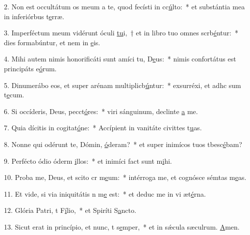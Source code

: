 2. Non est occultátum os meum a te, quod fecísti in cc\uline{ú}lto:~* et substántia mea in inferiórbus t\uline{e}rræ.\par 
3. Imperféctum meum vidérunt óculi \uline{tu}i,~† et in libro tuo omnes scrb\uline{é}ntur:~* dies formabúntur, et nem in \uline{e}is.\par 
4. Mihi autem nimis honorificáti sunt amíci tu, D\uline{e}us:~* nimis confortátus est principáts e\uline{ó}rum.\par 
5. Dinumerábo eos, et super arénam multiplicb\uline{ú}ntur:~* exsurréxi, et adhc sum t\uline{e}cum.\par 
6. Si occíderis, Deus, pecct\uline{ó}res:~* viri sánguinum, declinte \uline{a} me.\par 
7. Quia dícitis in cogitat\uline{ó}ne:~* Accípient in vanitáte civittes t\uline{u}as.\par 
8. Nonne qui odérunt te, Dómin, \uline{ó}deram?~* et super inimícos tuos tbesc\uline{é}bam?\par 
9. Perfécto ódio óderm \uline{i}llos:~* et inimíci fact sunt m\uline{i}hi.\par 
10. Proba me, Deus, et scito cr m\uline{e}um:~* intérroga me, et cognósce sémtas m\uline{e}as.\par 
11. Et vide, si via iniquitátis n m\uline{e} est:~* et deduc me in vi æt\uline{é}rna.\par 
12. Glória Patri, t F\uline{í}lio,~* et Spiríti S\uline{a}ncto.\par 
13. Sicut erat in princípio, et nunc, t s\uline{e}mper,~* et in sǽcula sæculrum. \uline{A}men.\par 
